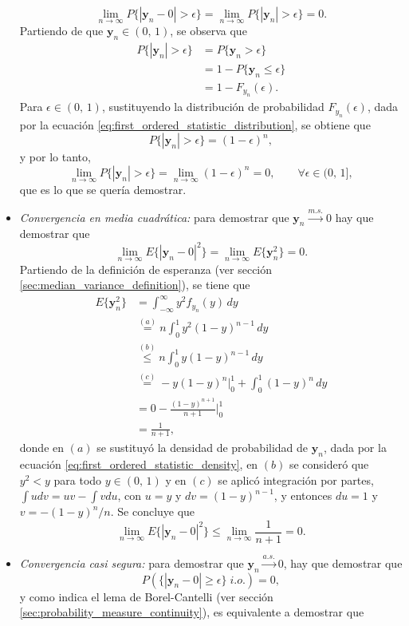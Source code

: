 \documentclass[a4paper]{report}
\newcommand{\y}{\mathbf{y}}
\begin{document}
\begin{itemize}
\[
  \lim_{n\to\infty}P\{|\y_n-0|>\epsilon\}=\lim_{n\to\infty}P\{|\y_n|>\epsilon\}=0.
\]
Partiendo de que \(\y_n\in(0,\,1)\), se observa que
\begin{align*}
 P\{|\y_n|>\epsilon\}&=P\{\y_n>\epsilon\}\\
   &=1-P\{\y_n\leq \epsilon\}\\
   &=1-F_{y_n}(\epsilon).
\end{align*}
Para \(\epsilon\in(0,\,1)\), sustituyendo la distribución de probabilidad \(F_{y_n}(\epsilon)\), dada por la ecuación \ref{eq:first_ordered_statistic_distribution}, se obtiene que
\begin{equation}\label{eq:convergence_example_probability}
 P\{|\y_n|>\epsilon\}=(1-\epsilon)^n,
\end{equation}
y por lo tanto,
\[
 \lim_{n\to\infty}P\{|\y_n|>\epsilon\}=\lim_{n\to\infty}(1-\epsilon)^n=0,\qquad\forall\epsilon\in(0,\,1],
\]
que es lo que se quería demostrar.
\item \emph{Convergencia en media cuadrática: } para demostrar que \(\y_n\overset{m.s.}{\longrightarrow}0\) hay que demostrar que
\[
  \lim_{n\to\infty}E\{|\y_n-0|^2\}=\lim_{n\to\infty}E\{\y_n^2\}=0.
\]
Partiendo de la definición de esperanza (ver sección \ref{sec:median_variance_definition}), se tiene que
\begin{align*}
 E\{\y_n^2\}&=\int_{-\infty}^{\infty}y^2f_{y_n}(y)\,dy\\
   &\overset{(a)}{=}n\int_{0}^{1}y^2(1-y)^{n-1}\,dy\\
   &\overset{(b)}{\leq}n\int_{0}^{1}y(1-y)^{n-1}\,dy\\
   &\overset{(c)}{=}-y(1-y)^n\bigg|_0^1+\int_{0}^{1}(1-y)^n\,dy\\
   &=0-\frac{(1-y)^{n+1}}{n+1}\bigg|_0^1\\
   &=\frac{1}{n+1},
\end{align*}
donde en \((a)\) se sustituyó la densidad de probabilidad de \(\y_n\), dada por la ecuación \ref{eq:first_ordered_statistic_density}, en \((b)\) se consideró que \(y^2<y\) para todo \(y\in(0,\,1)\) y en \((c)\) se aplicó integración por partes, \(\int udv=uv-\int vdu\), con \(u=y\) y \(dv=(1-y)^{n-1}\), y entonces \(du=1\) y \(v=-(1-y)^n/n\).
Se concluye que
\[
 \lim_{n\to\infty}E\{|\y_n-0|^2\}\leq\lim_{n\to\infty} \frac{1}{n+1}=0.
\]
\item \emph{Convergencia casi segura: } para demostrar que \(\y_n\overset{a.s.}{\longrightarrow}0\), hay que demostrar que
\[
  P(\{|\y_n-0|\geq\epsilon\}\;i.o.)=0,
\]
y como indica el lema de Borel-Cantelli (ver sección \ref{sec:probability_measure_continuity}), es equivalente a demostrar que

\end{itemize}
\end{document}
